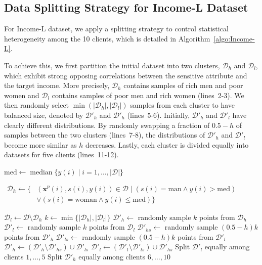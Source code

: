 \subsection{Data Splitting Strategy for Income-L Dataset }\label{app:datasplit_incomel}
For Income-L dataset, we apply a splitting strategy to control statistical heterogeneity among the 10 clients, which is detailed in Algorithm~\ref{algo:Income-L}. 


To achieve this, we first partition the initial dataset into two clusters, $\mathcal{D}_{h}$ and $\mathcal{D}_{l}$, which exhibit strong opposing correlations between the sensitive attribute and the target income. More precisely, $\mathcal{D}_h$ contains samples of rich men and poor women and $\mathcal{D}_{l}$ contains samples of poor men and rich women (lines~2-3).  
We then randomly select $ \min(|\mathcal{D}_{h}|,|\mathcal{D}_{l}|)$ samples from each cluster to have balanced size, denoted by $\mathcal{D}'_h$ and $\mathcal{D}'_h$ (lines~5-6). 
Initially, $\mathcal{D}'_h$ and $\mathcal{D}'_l$ have clearly different distributions. By randomly swapping a fraction of $0.5-h$ of samples between the two clusters (lines~7-8),  the distributions of $\mathcal{D}'_h$ and $\mathcal{D}'_l$ become more similar as $h$ decreases. Lastly, each cluster is divided equally into datasets for five clients (lines~11-12).

\begin{algorithm2e}[t]
  \caption{Splitting strategy for the Income-L dataset with heterogeneity level $h \in [0,0.5]$}
  \label{algo:Income-L}


  $\mathrm{med} \leftarrow \operatorname{median}
  \{y(i) \mid i=1,\ldots,|\mathcal{D}|\}$\;

  $\begin{aligned}
    \mathcal{D}_h \leftarrow \{&(\mathbf{x}^p(i),s(i),y(i)) \in \mathcal{D}
    \mid (s(i)=\mathrm{man} \land y(i)>\mathrm{med}) \\
    &\lor (s(i)=\mathrm{woman} \land y(i)\leq\mathrm{med})\}
  \end{aligned}$\;

  $\mathcal{D}_l \leftarrow \mathcal{D}\setminus\mathcal{D}_h$\;
  $k \leftarrow \min\{|\mathcal{D}_h|,|\mathcal{D}_l|\}$\;
  $\mathcal{D}'_h \leftarrow$ randomly sample $k$ points from $\mathcal{D}_h$\;
  $\mathcal{D}'_l \leftarrow$ randomly sample $k$ points from $\mathcal{D}_l$\;
  $\mathcal{D}'_{hs} \leftarrow$ randomly sample $(0.5-h)k$ points from $\mathcal{D}'_h$\;
  $\mathcal{D}'_{ls} \leftarrow$ randomly sample $(0.5-h)k$ points from $\mathcal{D}'_l$\;
  $\mathcal{D}'_h \leftarrow
  (\mathcal{D}'_h\setminus\mathcal{D}'_{hs})\cup\mathcal{D}'_{ls}$\;
  $\mathcal{D}'_l \leftarrow
  (\mathcal{D}'_l\setminus\mathcal{D}'_{ls})\cup\mathcal{D}'_{hs}$\;
  Split $\mathcal{D}'_l$ equally among clients $1,\ldots,5$\;
  Split $\mathcal{D}'_h$ equally among clients $6,\ldots,10$\;
\end{algorithm2e}


